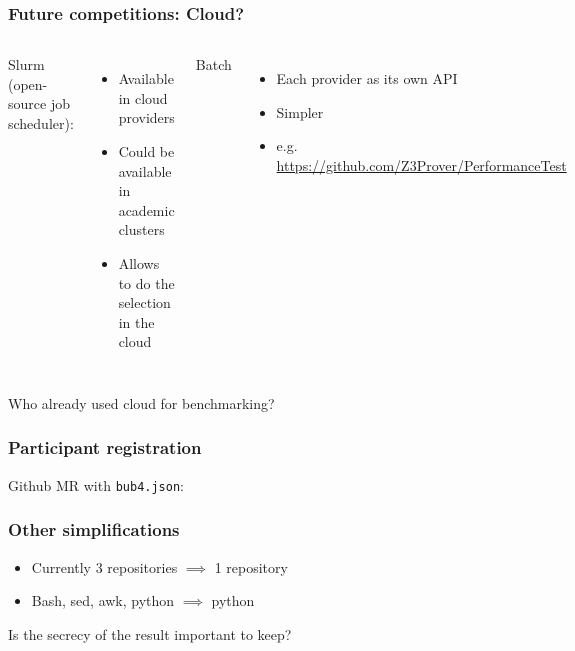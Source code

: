 \documentclass[table]{beamer}
\begin{document}







\begin{frame}
    \frametitle{Future competitions: Cloud? \logocloud}
\begin{columns}
    Slurm (open-source job scheduler):
    \begin{itemize}
        \item Available in cloud providers
        \item Could be available in academic clusters
        \item Allows to do the selection in the cloud
    \end{itemize}
    Batch
    \begin{itemize}
        \item Each provider as its own API 
        \item Simpler
        \item e.g. \url{https://github.com/Z3Prover/PerformanceTest}
    \end{itemize}
\end{columns}
    \pause
    \vfill
    \begin{center}
        \large
        Who already used cloud for benchmarking?
    \end{center}
\end{frame}



\begin{frame}
    \frametitle{Participant registration}
    Github MR with \lstinline{bub4.json}:
    
    
\end{frame}


\begin{frame}
    \frametitle{Other simplifications}
    \begin{itemize}
        \item Currently 3 repositories $\implies$ 1 repository
        \item Bash, sed, awk, python $\implies$ python
    \end{itemize}
\pause
\vfill
    \begin{center}
        {\large Is the secrecy of the result important to keep?}
    \end{center}
\end{frame}
\end{document}
